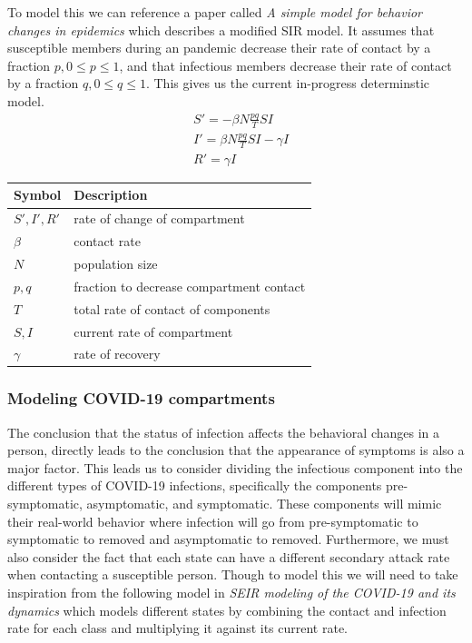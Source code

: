 \documentclass{article}
\begin{document}
To model this we can reference a paper called \textit{A simple model for behavior changes in epidemics} which describes a modified SIR model. It assumes that susceptible members during an pandemic decrease their rate of contact by a fraction $p, 0 \le p \le 1$, and that infectious members decrease their rate of contact by a fraction $q, 0 \le q \le 1$. This gives us the current in-progress determinstic model.
\begin{align*}
	 & S' = -\beta N \frac{pq}{T}SI           \\
	 & I' = \beta N \frac{pq}{T}SI - \gamma I \\
	 & R' = \gamma I
\end{align*}

\begin{center}
	\begin{tabular}{|l|l|}
		\hline
		Symbol       & Description                              \\ [0.5ex]
		\hline\hline
		$S', I', R'$ & rate of change of compartment            \\
		\hline
		$\beta$      & contact rate                             \\
		\hline
		$N$          & population size                          \\
		\hline
		$p,q$        & fraction to decrease compartment contact \\
		\hline
		$T$          & total rate of contact of components      \\
		\hline
		$S, I$       & current rate of compartment              \\
		\hline
		$\gamma$     & rate of recovery                         \\
		\hline
	\end{tabular}
\end{center}
\cite{behavior}


\subsubsection{Modeling COVID-19 compartments}
The conclusion that the status of infection affects the behavioral changes in a person, directly leads to the conclusion that the appearance of symptoms is also a major factor. This leads us to consider dividing the infectious component into the different types of COVID-19 infections, specifically the components pre-symptomatic, asymptomatic, and symptomatic. These components will mimic their real-world behavior where infection will go from pre-symptomatic to symptomatic to removed and asymptomatic to removed. Furthermore, we must also consider the fact that each state can have a different secondary attack rate when contacting a susceptible person. \cite{review} Though to model this we will need to take inspiration from the following model in \textit{SEIR modeling of the COVID-19 and its dynamics} which models different states by combining the contact and infection rate for each class and multiplying it against its current rate.
\end{document}
